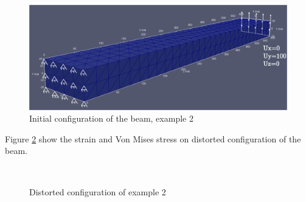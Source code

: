 \documentclass[oneside,11pt,times]{book}
\begin{document}
\begin{figure}[h!]
    \centering
    \includegraphics[scale=0.35]{imgs/Examples/ex2-BC.png}
    \caption{Initial configuration of the beam, example 2}
    \label{ex2-BC}
\end{figure}

Figure \ref{ex2-def} show the strain and Von Mises stress on distorted configuration of the beam.

\begin{figure}[h]
  \begin{center}
    \mbox{
      \quad
       }
    \caption{Distorted configuration of example 2}
    \label{ex2-def}
  \end{center}
\end{figure}
\end{document}
